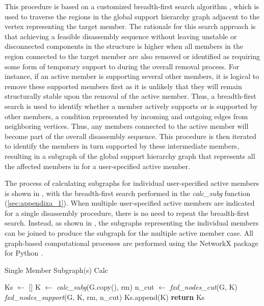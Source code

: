         This procedure is based on a customized breadth-first search algorithm \citep{valiente_algorithms_2021}, which is used to traverse the regions in the global support hierarchy graph adjacent to the vertex representing the target member. The rationale for this search approach is that achieving a feasible disassembly sequence without leaving unstable or disconnected components in the structure is higher when all members in the region connected to the target member are also removed or identified as requiring some form of temporary support to during the overall removal process. For instance, if an active member is supporting several other members, it is logical to remove these supported members first as it is unlikely that they will remain structurally stable upon the removal of the active member. Thus, a breadth-first search is used to identify whether a member actively supports or is supported by other members, a condition represented by incoming and outgoing edges from neighboring vertices. Thus, any members connected to the active member will become part of the overall disassembly sequence. This procedure is then iterated to identify the members in turn supported by these intermediate members, resulting in a subgraph of the global support hierarchy graph that represents all the affected members in for a user-specified active member.

        The process of calculating subgraphs for individual user-specified active members is shown in , with the breadth-first search performed in the \textit{calc\_subg} function (\cref{sec:appendixa_1}). When multiple user-specified active members are indicated for a single disassembly procedure, there is no need to repeat the breadth-first search. Instead, as shown in , the subgraphs representing the individual members can be joined to produce the subgraph for the multiple active member case. All graph-based computational processes are performed using the NetworkX package for Python \citep{hagberg_exploring_2008}.


        \begin{algorithm}
            \caption{Single Member Subgraph(s) Calc}
            \label{alg:alg1_single}
            \begin{algorithmic}[1]
                \State Ks $\gets$ []
                \State
                    \State K $\gets$ \textit{calc\_subg}(G.copy(), rm)
                    \State n\_cut $\gets$ \textit{fxd\_nodes\_cut}(G, K)
                    \State \textit{fxd\_nodes\_support}(G, K, rm, n\_cut)
                    \State Ks.append(K)
                \EndFor
                \State
                \State \textbf{return} Ks
            \EndProcedure
            \end{algorithmic}
        \end{algorithm}

